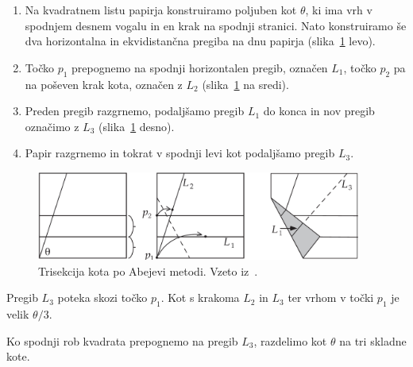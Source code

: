 \begin{enumerate}
    \item Na kvadratnem listu papirja konstruiramo poljuben kot $\theta$, ki ima vrh v spodnjem desnem vogalu in en krak na spodnji stranici. Nato konstruiramo še dva horizontalna in ekvidistančna pregiba na dnu papirja (slika~\ref{fig:abe_1} levo).
    \item Točko $p_1$ prepognemo na spodnji horizontalen pregib, označen $L_1$, točko $p_2$ pa na poševen krak kota, označen z $L_2$ (slika~\ref{fig:abe_1} na sredi).
    \item Preden pregib razgrnemo, podaljšamo pregib $L_1$ do konca in nov pregib označimo z $L_3$ (slika~\ref{fig:abe_1} desno).
    \item Papir razgrnemo in tokrat v spodnji levi kot podaljšamo pregib $L_3$.
\end{enumerate}
\begin{figure}[h]
    \centering
    \includegraphics[width=0.95\textwidth]{images/starogr_problemi/abe_nastavek1.png}
    \caption[Abejeva metoda ($1$.\ del)]{Trisekcija kota po Abejevi metodi. Vzeto iz~\cite[str.\ 64]{hull2013}.}
    \label{fig:abe_1}
\end{figure}


\begin{trditev}
    Pregib $L_3$ poteka skozi točko $p_1$. Kot s krakoma $L_2$ in $L_3$ ter vrhom v točki $p_1$ je velik $\theta/3$.
\end{trditev}
\begin{posledica}
    Ko spodnji rob kvadrata prepognemo na pregib $L_3$, razdelimo kot $\theta$ na tri skladne kote.
\end{posledica}

